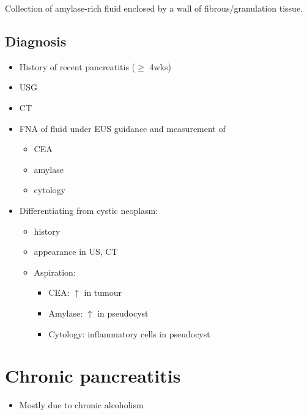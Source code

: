 \documentclass[
  14pt,
]{memoir}
\providecommand{\tightlist}{%
  \setlength{\itemsep}{0pt}\setlength{\parskip}{0pt}}
\begin{document}
Collection of amylase-rich fluid enclosed by a wall of
fibrous/granulation tissue.

\hypertarget{diagnosis}{%
\subsection{Diagnosis}\label{diagnosis}}

\begin{itemize}
\tightlist
\item
  History of recent pancreatitis (\(\ge\) 4wks)
\item
  USG
\item
  CT
\item
  FNA of fluid under EUS guidance and measurement of

  \begin{itemize}
  \tightlist
  \item
    CEA
  \item
    amylase
  \item
    cytology
  \end{itemize}
\item
  Differentiating from cystic neoplasm:

  \begin{itemize}
  \tightlist
  \item
    history
  \item
    appearance in US, CT
  \item
    Aspiration:

    \begin{itemize}
    \tightlist
    \item
      CEA: \(\uparrow\) in tumour
    \item
      Amylase: \(\uparrow\) in pseudocyst
    \item
      Cytology: inflammatory cells in pseudocyst
    \end{itemize}
  \end{itemize}
\end{itemize}

\pagebreak

\hypertarget{chronic-pancreatitis}{%
\section{Chronic pancreatitis}\label{chronic-pancreatitis}}

\begin{itemize}
\tightlist
\item
  Mostly due to chronic alcoholism
\end{itemize}
\end{document}
